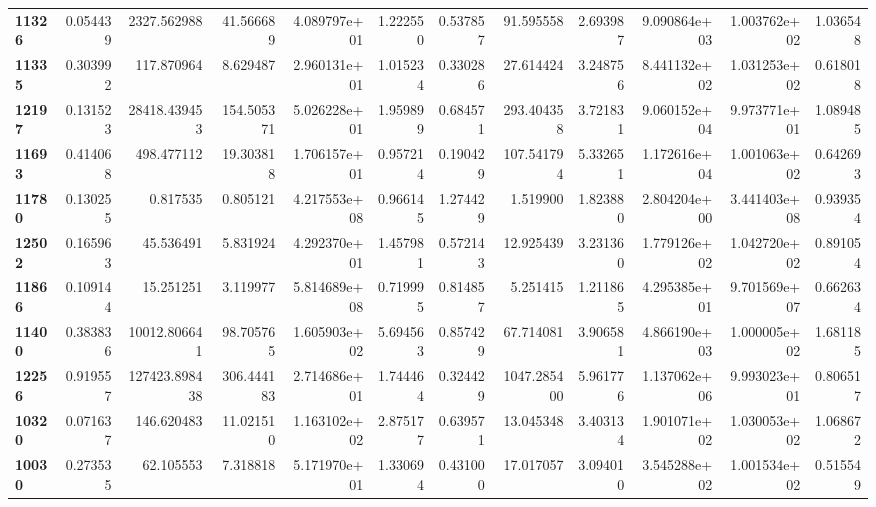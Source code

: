 \begin{table}[h]
\begin{tabular}{lrrrrrrrrrrr}
\textbf{11326} &  0.054439 &    2327.562988 &       41.566689 &               4.089797e+01 &  1.222550 &  0.537857 &    91.595558 &   2.693987 &  9.090864e+03 &  1.003762e+02 &     1.036548 \\
\textbf{11335} &  0.303992 &     117.870964 &        8.629487 &               2.960131e+01 &  1.015234 &  0.330286 &    27.614424 &   3.248756 &  8.441132e+02 &  1.031253e+02 &     0.618018 \\
\textbf{12197} &  0.131523 &   28418.439453 &      154.505371 &               5.026228e+01 &  1.959899 &  0.684571 &   293.404358 &   3.721831 &  9.060152e+04 &  9.973771e+01 &     1.089485 \\
\textbf{11693} &  0.414068 &     498.477112 &       19.303818 &               1.706157e+01 &  0.957214 &  0.190429 &   107.541794 &   5.332651 &  1.172616e+04 &  1.001063e+02 &     0.642693 \\
\textbf{11780} &  0.130255 &       0.817535 &        0.805121 &               4.217553e+08 &  0.966145 &  1.274429 &     1.519900 &   1.823880 &  2.804204e+00 &  3.441403e+08 &     0.939354 \\
\textbf{12502} &  0.165963 &      45.536491 &        5.831924 &               4.292370e+01 &  1.457981 &  0.572143 &    12.925439 &   3.231360 &  1.779126e+02 &  1.042720e+02 &     0.891054 \\
\textbf{11866} &  0.109144 &      15.251251 &        3.119977 &               5.814689e+08 &  0.719995 &  0.814857 &     5.251415 &   1.211865 &  4.295385e+01 &  9.701569e+07 &     0.662634 \\
\textbf{11400} &  0.383836 &   10012.806641 &       98.705765 &               1.605903e+02 &  5.694563 &  0.857429 &    67.714081 &   3.906581 &  4.866190e+03 &  1.000005e+02 &     1.681185 \\
\textbf{12256} &  0.919557 &  127423.898438 &      306.444183 &               2.714686e+01 &  1.744464 &  0.324429 &  1047.285400 &   5.961776 &  1.137062e+06 &  9.993023e+01 &     0.806517 \\
\textbf{10320} &  0.071637 &     146.620483 &       11.021510 &               1.163102e+02 &  2.875177 &  0.639571 &    13.045348 &   3.403134 &  1.901071e+02 &  1.030053e+02 &     1.068672 \\
\textbf{10030} &  0.273535 &      62.105553 &        7.318818 &               5.171970e+01 &  1.330694 &  0.431000 &    17.017057 &   3.094010 &  3.545288e+02 &  1.001534e+02 &     0.515549 \\
\bottomrule
\end{tabular}
\end{table}
